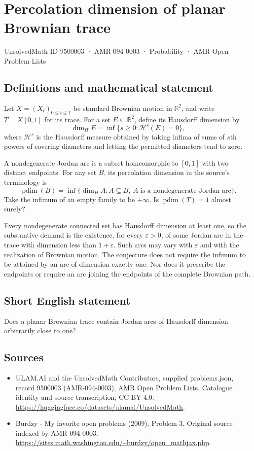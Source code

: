 \documentclass[11pt,a4paper]{article}
\begin{document}
\section*{Percolation dimension of planar Brownian trace}\label{9500003}
{\small UnsolvedMath ID 9500003 · AMR-094-0003 · Probability · AMR Open Problem Lists}
\subsection{Definitions and mathematical statement}
Let $X=(X_t)_{0\le t\le1}$ be standard Brownian motion in $\mathbb R^2$, and write $T=X[0,1]$ for its trace. For a set $E\subseteq\mathbb R^2$, define its Hausdorff dimension by
\[
\dim_H E=\inf\{s\ge0:\mathcal H^s(E)=0\},
\]
where $\mathcal H^s$ is the Hausdorff measure obtained by taking infima of sums of $s$th powers of covering diameters and letting the permitted diameters tend to zero.

A nondegenerate Jordan arc is a subset homeomorphic to $[0,1]$ with two distinct endpoints. For any set $B$, its percolation dimension in the source's terminology is
\[
\operatorname{pdim}(B)=\inf\{\dim_H A:A\subseteq B,
\ A\text{ is a nondegenerate Jordan arc}\}.
\]
Take the infimum of an empty family to be $+\infty$. Is $\operatorname{pdim}(T)=1$ almost surely?

Every nondegenerate connected set has Hausdorff dimension at least one, so the substantive demand is the existence, for every $\varepsilon>0$, of some Jordan arc in the trace with dimension less than $1+\varepsilon$. Such arcs may vary with $\varepsilon$ and with the realization of Brownian motion. The conjecture does not require the infimum to be attained by an arc of dimension exactly one. Nor does it prescribe the endpoints or require an arc joining the endpoints of the complete Brownian path.
\subsection{Short English statement}
Does a planar Brownian trace contain Jordan arcs of Hausdorff dimension arbitrarily close to one?
\subsection{Sources}
\begin{itemize}
\item[S1] ULAM.AI and the UnsolvedMath Contributors, supplied problems.json, record 9500003 (AMR-094-0003), AMR Open Problem Lists. Catalogue identity and source transcription; CC BY 4.0.
\url{https://huggingface.co/datasets/ulamai/UnsolvedMath}.
\item[S2] Burdzy - My favorite open problems (2009), Problem 3. Original source indexed by AMR-094-0003.
\url{https://sites.math.washington.edu/~burdzy/open_mathjax.php}.
\end{itemize}
\end{document}
